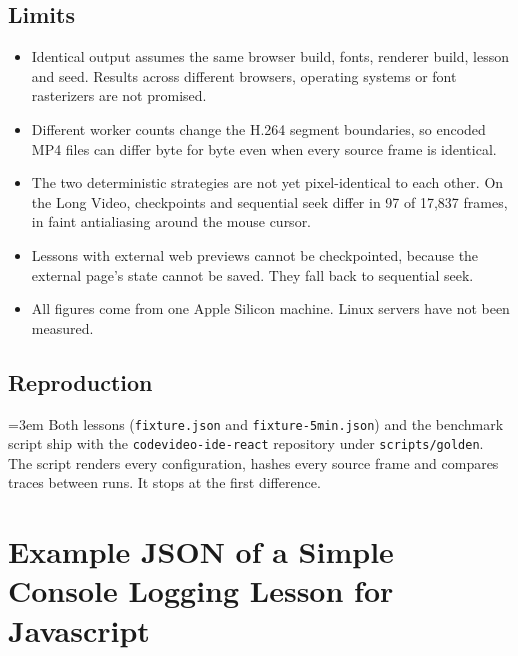 \documentclass[11pt, a4paper]{article}
\begin{document}
\begin{appendices}
\subsection{Limits}

\begin{itemize}
    \item Identical output assumes the same browser build, fonts, renderer build, lesson and seed. Results across different browsers, operating systems or font rasterizers are not promised.
    \item Different worker counts change the H.264 segment boundaries, so encoded MP4 files can differ byte for byte even when every source frame is identical.
    \item The two deterministic strategies are not yet pixel-identical to each other. On the Long Video, checkpoints and sequential seek differ in 97 of 17,837 frames, in faint antialiasing around the mouse cursor.
    \item Lessons with external web previews cannot be checkpointed, because the external page's state cannot be saved. They fall back to sequential seek.
    \item All figures come from one Apple Silicon machine. Linux servers have not been measured.
\end{itemize}

\subsection{Reproduction}

{\emergencystretch=3em Both lessons (\texttt{fixture.json} and \texttt{fixture-\allowbreak 5min.json}) and the benchmark script ship with the \texttt{codevideo-\allowbreak ide-\allowbreak react} repository under \texttt{scripts/\allowbreak golden}. The script renders every configuration, hashes every source frame and compares traces between runs. It stops at the first difference.\par}

\section{Example JSON of a Simple Console Logging Lesson for Javascript}
\label{app:example-json}


\end{appendices}
\end{document}
